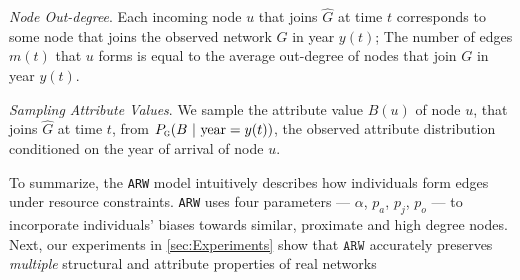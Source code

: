 \textit{Node Out-degree}.
Each incoming node $u$ that joins $\hat{G}$ at time $t$ corresponds to some
node that joins the observed network $G$ in year $y(t)$; The number of edges $m(t)$
that $u$ forms is equal to the average out-degree of nodes that join $G$ in year $y(t)$.

\textit{Sampling Attribute Values}. 
We sample the attribute value $B(u)$ of node $u$, that
joins $\hat{G}$ at time $t$, from $P_{\textsc{g}}(B{\mbox{ | year}=y(t)})$, the observed attribute distribution conditioned on the year of arrival of node $u$.




To summarize, the \texttt{ARW} model
intuitively describes how individuals form edges under resource constraints.
\texttt{ARW} uses four parameters --- $\alpha$, $p_a$, $p_j$, $p_o$ --- to incorporate
individuals' biases towards similar, proximate and high degree nodes.
Next, our experiments in
\cref{sec:Experiments} show that $\texttt{ARW}$ accurately preserves
\textit{multiple} structural and attribute properties of real networks

